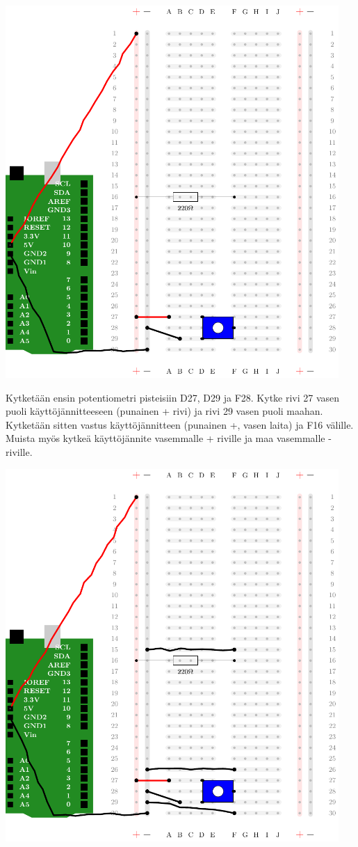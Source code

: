 \includegraphics[width=0.95\textwidth]{kuvat/kuva19.pdf}

Kytketään ensin potentiometri pisteisiin D27, D29 ja F28. Kytke rivi 27 vasen puoli käyttöjännitteeseen (punainen + rivi) ja rivi 29 vasen puoli maahan. Kytketään sitten vastus käyttöjännitteen (punainen +, vasen laita) ja F16 välille. Muista myös kytkeä käyttöjännite vasemmalle + riville ja maa vasemmalle - riville.

\includegraphics[width=0.95\textwidth]{kuvat/kuva20.pdf}

